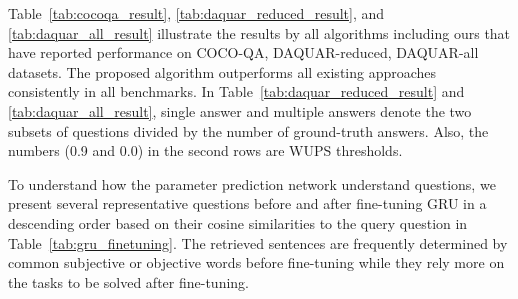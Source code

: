 \documentclass[10pt,twocolumn,letterpaper]{article}
\begin{document}
Table~\ref{tab:cocoqa_result}, \ref{tab:daquar_reduced_result}, and \ref{tab:daquar_all_result} illustrate the results by all algorithms including ours that have reported performance on COCO-QA, DAQUAR-reduced, DAQUAR-all datasets.
The proposed algorithm outperforms all existing approaches consistently in all benchmarks.
In Table~\ref{tab:daquar_reduced_result} and \ref{tab:daquar_all_result}, single answer and multiple answers denote the two subsets of questions divided by the number of ground-truth answers.
Also, the numbers (0.9 and 0.0) in the second rows are WUPS thresholds.


To understand how the parameter prediction network understand questions, we present several representative questions before and after fine-tuning GRU in a descending order based on their cosine similarities to the query question in Table~\ref{tab:gru_finetuning}.
The retrieved sentences are frequently determined by common subjective or objective words before fine-tuning while they rely more on the tasks to be solved after fine-tuning.
\end{document}
